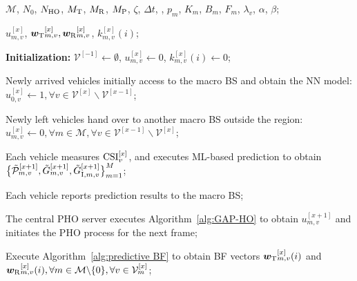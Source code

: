 \documentclass[conference, a4paper]{IEEEtran}
\newcommand{\rev}[1]{\textcolor{revisioncolor}{{}#1}}
\newif\ifshowdeletions
\newcommand{\currentdel}[1]{\ifshowdeletions\textcolor{deletioncolor}{\sout{#1}}\fi}
\theoremstyle{remark}
\begin{document}
\iffalse
    \begin{algorithm}[htbp]
        \caption{ML-Based Energy-Efficient Proactive Coordination of Handover, Beamforming and Resource Allocation (MEET-COBRA)}
        \label{alg:MEET-COBRA}
        \renewcommand{\algorithmicrequire}{\textbf{Input:}}
        \renewcommand{\algorithmicensure}{\textbf{Output:}}
        \begin{algorithmic}[1] %
            \REQUIRE  %
            $\mathcal{M}$, $N_0$, $N_{\textup{HO}}$, $M_{\rm T}$, $M_{\rm R}$, $M_{\rm P}$, $\zeta$, $\Delta t$, \currentdel{$\tau^{{\rm th}}$}, $p_m$, $K_m$, $B_m$, $F_m$, $\lambda_v$, $\alpha$, $\beta$;
            
            \ENSURE %
            $u_{m,v}^{[x]}$,
            ${\bm{w}_{\rm T}}_{m,v}^{[x]},{\bm{w}_{\rm R}}_{m,v}^{[x]}$,
            $k_{m,v}^{[x]}(i)$;
    
            \STATE \textbf{Initialization:}  $\mathcal{V}^{[-1]} \leftarrow \emptyset$, $u_{m,v}^{[x]} \leftarrow 0$, $k_{m,v}^{[x]}(i) \leftarrow 0$;
            
                \STATE Newly arrived vehicles initially access to the macro BS and obtain the NN model: $u_{0,v}^{[x]} \leftarrow 1, \forall v \in \mathcal{V}^{[x]} \backslash \mathcal{V}^{[x-1]}$;
                
                \STATE Newly left vehicles hand over to another macro BS outside the region: $u_{m,v}^{[x]} \leftarrow 0, \forall m \in \mathcal{M}, \forall v \in \mathcal{V}^{[x-1]} \backslash \mathcal{V}^{[x]}$;
                
                \STATE Each vehicle measures ${\rm CSI}_v^{[x]}$, and executes ML-based prediction to obtain $\bigl\{\Tilde{\mathcal{P}}_{m,v}^{[x+1]}, \Tilde{G}_{m,v}^{[x+1]}, \Tilde{G}_{{\rm I},m,v}^{[x+1]}\bigr\}_{m=1}^M$;
    
                \STATE Each vehicle reports prediction results to the macro BS;
                
                \STATE The central PHO server executes Algorithm~\ref{alg:GAP-HO} to obtain $u_{m,v}^{[x+1]}$ and initiates the PHO process for the next frame;
                
                    
                    \STATE Execute Algorithm~\ref{alg:predictive BF} to obtain BF vectors ${\bm{w}_{\rm T}}_{m,v}^{[x]}(i)$ and ${\bm{w}_{\rm R}}_{m,v}^{[x]}(i), \forall m \in \mathcal{M}\backslash\{0\}, \forall v\in \mathcal{V}^{[x]}_m$;
    

\end{algorithmic}
\end{algorithm}
\end{document}
